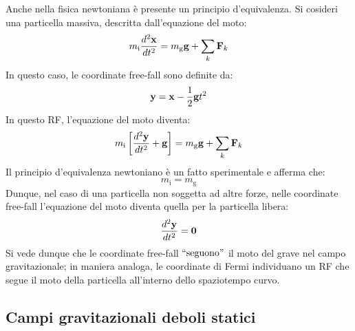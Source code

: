 Anche nella fisica newtoniana è presente un principio d'equivalenza. Si cosideri una particella massiva, descritta dall'equazione del moto:
\begin{equation}
	m_{\text{i}} \frac{d^2 \mathbf{x}}{dt^2} = m_{\text{g}} \mathbf{g} + \sum_{k} \mathbf{F}_k
	\label{eq:5.20}
\end{equation}
In questo caso, le coordinate free-fall sono definite da:
\begin{equation}
	\mathbf{y} = \mathbf{x} - \frac{1}{2} \mathbf{g} t^2
	\label{eq:5.21}
\end{equation}
In questo RF, l'equazione del moto diventa:
\begin{equation}
	m_{\text{i}} \left[ \frac{d^2\mathbf{y}}{dt^2} + \mathbf{g} \right] = m_{\text{g}} \mathbf{g} + \sum_{k} \mathbf{F}_k
	\label{eq:5.22}
\end{equation}
Il principio d'equivalenza newtoniano è un fatto sperimentale e afferma che:
\begin{equation}
	m_{\text{i}} = m_{\text{g}}
	\label{eq:5.23}
\end{equation}
Dunque, nel caso di una particella non soggetta ad altre forze, nelle coordinate free-fall l'equazione del moto diventa quella per la particella libera:
\begin{equation}
	\frac{d^2 \mathbf{y}}{dt^2} = \mathbf{0}
	\label{eq:5.24}
\end{equation}
Si vede dunque che le coordinate free-fall $ ``\text{seguono}" $ il moto del grave nel campo gravitazionale; in maniera analoga, le coordinate di Fermi individuano un RF che segue il moto della particella all'interno dello spaziotempo curvo.

\subsection{Campi gravitazionali deboli statici}

